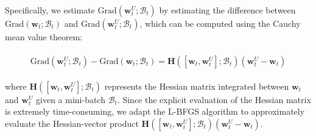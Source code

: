 \documentclass[11pt]{article}
\newcommand{\uw}{\textbf{w}^{U}}
\newcommand{\w}{\textbf{w}}
\newcommand{\x}{\textbf{x}}
\newcommand{\bH}{\textbf{H}}
\newcommand{\y}{y}
\newcommand{\miniB}{\mathscr{B}}
\begin{document}
Specifically, we estimate $\text{Grad}(\uw_t; \miniB_t)$ by estimating the difference between $\text{Grad}(\w_t; \miniB_t)$ and $\text{Grad}(\uw_t; \miniB_t)$, which can be computed using the Cauchy mean value theorem:
\begin{small}
\begin{align*}
\begin{split}
    \text{Grad}(\uw_t; \miniB_t) - \text{Grad}(\w_t; \miniB_t)
     =\bH([\w_t, \uw_t];\miniB_t)\left(\uw_{t} - \w_t\right)
\end{split}
\end{align*}
\end{small}
where $\bH([\w_t, \uw_t]; \miniB_t)$ represents the Hessian matrix integrated between $\w_t$ and $\uw_t$ given a mini-batch $\miniB_t$.
\noindent
Since the explicit evaluation of the Hessian matrix is extremely time-consuming, we adapt the L-BFGS algorithm \cite{mokhtari2015global} to approximately evaluate the Hessian-vector product $\bH([\w_t, \uw_t];\miniB_t)\left(\uw_{t} - \w_t\right)$. 
\end{document}
